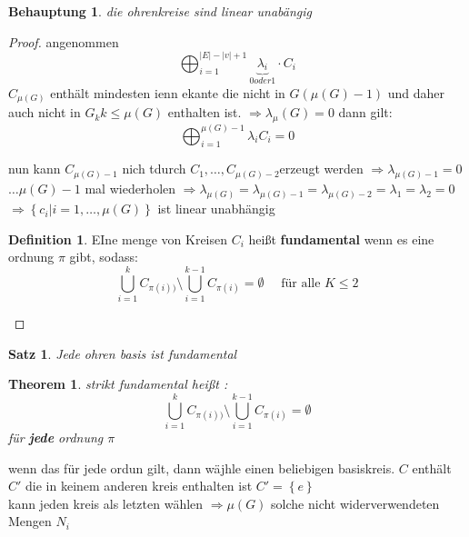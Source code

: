 \documentclass[a4paper]{article}
\newtheorem{theorem}{Theorem}[section]
\newtheorem{satz}{Satz}
\newtheorem{behauptung}{Behauptung}
\theoremstyle{definition}
\newtheorem*{definition}{Definition}
\theoremstyle{remark}
\begin{document}
\begin{behauptung}
  die ohrenkreise sind linear unabängig	

\end{behauptung}
\begin{proof}
  angenommen 
  \begin{equation*}
    \bigoplus_{i=1}^{|E|-|v|+1}
    \underbrace{\lambda _i}_{0 oder 1}\cdot C_i
  \end{equation*}
  $C_{\mu(G)}$ enthält mindesten ienn ekante die nicht in $G(\mu(G)-1)$ und daher auch nicht in $G_k k\leq \mu(G)$ enthalten ist.
  $\Rightarrow \lambda _\mu(G)=0$
  dann gilt:
  \begin{equation*} 
    \bigoplus_{i=1}^{\mu(G)-1}\lambda _iC_i=0
  \end{equation*}



  nun kann $C_{\mu(G)-1}$ nich tdurch $C_1,\dots, C_{\mu(G)-2}$erzeugt werden 
  $\Rightarrow \lambda_{\mu(G)-1}= 0$\\
  $\dots \mu(G)-1$ mal wiederholen
  $\Rightarrow \lambda _{\mu(G)}= \lambda_{\mu(G)-1}= \lambda _{\mu(G)-2}=\lambda _1=\lambda _2=0$\\
  $\Rightarrow \left\{ c_i|i=1,\dots,\mu(G) \right\}$ ist linear unabhängig
  \begin{definition}
    EIne menge von Kreisen $C_i$ heißt \textbf{fundamental} wenn es eine ordnung $\pi$ gibt, sodass:
    \begin{equation*}
    \bigcup_{i=1}^{k}C_{\pi(i))}   \setminus   \bigcup _{i=1}^{k-1} C_{\pi(i)}= \emptyset \quad \textrm{ für alle }  K\leq 2 
    \end{equation*}
  \end{definition}
\end{proof}
\begin{satz}
  Jede ohren basis ist fundamental
\end{satz}
\begin{theorem}
  strikt fundamental heißt :
  \begin{equation*}
    \bigcup_{i=1}^{k}C_{\pi(i))}   \setminus   \bigcup _{i=1}^{k-1} C_{\pi(i)}= \emptyset
  \end{equation*}
  für \textbf{jede} ordnung $\pi$
\end{theorem}
wenn das für jede ordun gilt, dann wäjhle einen beliebigen basiskreis. $C$ enthält $C'$ die in keinem anderen kreis enthalten ist  $C'=\left\{ e \right\}$\\
kann jeden kreis als letzten wählen 
$\Rightarrow \mu(G)$ solche nicht widerverwendeten Mengen $N_i$
\end{document}
